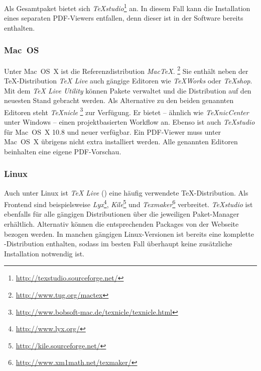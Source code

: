 Als Gesamtpaket bietet sich \emph{TeXstudio}\footnote{\url{http://texstudio.sourceforge.net/}} an. 
In diesem Fall kann die Installation eines separaten PDF-Viewers entfallen, denn dieser ist in der 
Software bereits enthalten.

\subsubsection{Mac~OS}
\label{sec:MacOs}

Unter Mac~OS~X ist die Referenzdistribution \emph{MacTeX}.%
\footnote{\url{http://www.tug.org/mactex}} 
Sie enthält neben der TeX-Distribution \emph{TeX Live} auch gängige Editoren wie \emph{TeXWorks} oder \emph{TeXshop}. Mit dem \emph{TeX Live Utility} können Pakete verwaltet und die Distribution auf den neuesten Stand gebracht werden. Als Alternative zu den beiden genannten Editoren steht \emph{TeXnicle}%
\footnote{\url{http://www.bobsoft-mac.de/texnicle/texnicle.html}} zur Verfügung. Er bietet -- ähnlich wie \emph{TeXnicCenter} unter Windows -- einen projektbasierten Workflow an.
Ebenso ist auch \emph{TeXstudio} für Mac~OS~X 10.8 und neuer verfügbar.
Ein PDF-Viewer muss unter Mac~OS~X übrigens nicht extra installiert werden. Alle genannten Editoren beinhalten eine eigene PDF-Vorschau.



\subsubsection{Linux}

Auch unter Linux ist \emph{TeX Live} (\so) eine häufig verwendete TeX-Distri\-bution. 
Als Frontend sind beispielsweise
\emph{Lyx}\footnote{\url{http://www.lyx.org/}},
\emph{Kile}\footnote{\url{http://kile.sourceforge.net/}} und
\emph{Texmaker}\footnote{\url{http://www.xm1math.net/texmaker/}} 
verbreitet.
\emph{TeXstudio} ist ebenfalls für alle gängigen Distributionen über die jeweiligen Paket-Manager erhältlich. Alternativ können die entsprechenden Packages von der Webseite bezogen werden.
In manchen gängigen Linux-Versionen ist bereits eine komplette \latex-Distribution enthalten, sodass im besten Fall überhaupt keine zusätzliche Installation notwendig ist.  


